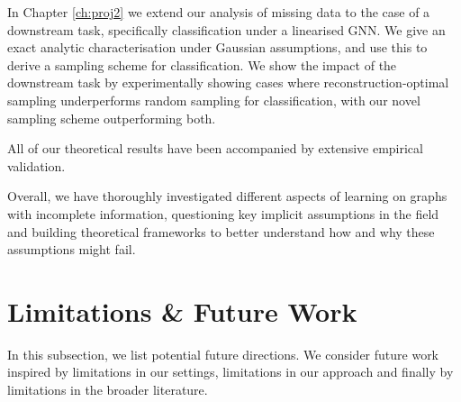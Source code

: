 In Chapter \ref{ch:proj2} we extend our analysis of missing data to the case of a downstream task, specifically classification under a linearised GNN.  We give an exact analytic characterisation under Gaussian assumptions, and use this to derive a sampling scheme for classification. We show the impact of the downstream task by experimentally showing cases where reconstruction-optimal sampling underperforms random sampling for classification, with our novel sampling scheme outperforming both.

All of our theoretical results have been accompanied by extensive empirical validation.

Overall, we have thoroughly investigated different aspects of learning on graphs with incomplete information, questioning key implicit assumptions in the field and building theoretical frameworks to better understand how and why these assumptions might fail.

\section{Limitations \& Future Work}
In this subsection, we list potential future directions. We consider future work inspired by limitations in our settings, limitations in our approach and finally by limitations in the broader literature.

